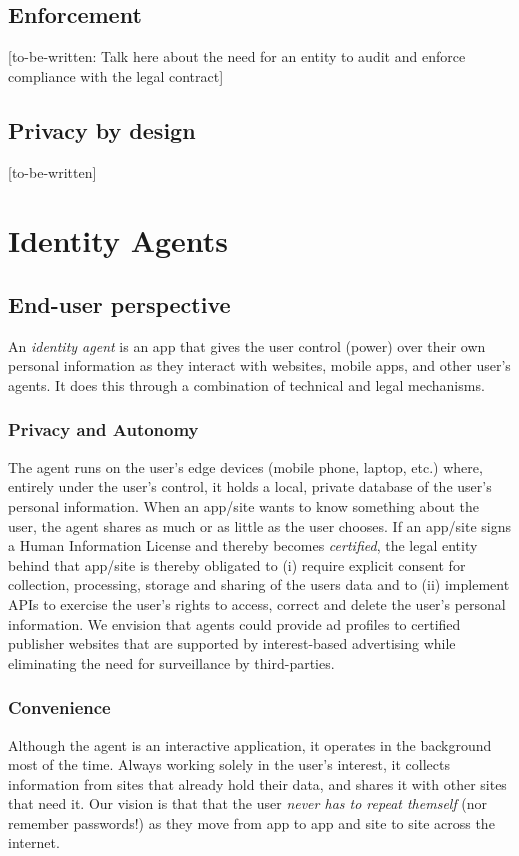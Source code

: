 \documentclass[11pt, oneside]{article}   	%
\begin{document}
\subsection{Enforcement}

[to-be-written: Talk here about the need for an entity to audit and enforce compliance with the legal contract]

\subsection{Privacy by design}
[to-be-written]

\section{Identity Agents} 

\subsection{End-user perspective}
An \emph{identity agent} is an app that gives the user control (power) over their own personal information as they interact with websites, mobile apps, and other user's agents. It does this through a combination of technical and legal mechanisms.

\subsubsection{Privacy and Autonomy} 
The agent runs on the user's edge devices (mobile phone, laptop, etc.) where, entirely under the user's control, it holds a local, private database of the user's personal information. When an app/site wants to know something about the user, the agent shares as much or as little as the user chooses. If an app/site signs a Human Information License and thereby becomes \emph{certified}, the legal entity behind that app/site is thereby obligated to (i) require explicit consent for collection, processing, storage and sharing of the users data and to (ii) implement APIs to exercise the user's rights to access, correct and delete the user's personal information. We envision that agents could provide ad profiles to certified publisher websites that are supported by interest-based advertising while eliminating the need for surveillance by third-parties.

\subsubsection{Convenience}
Although the agent is an interactive application, it operates in the background most of the time. Always working solely in the user's interest, it collects information from sites that already hold their data, and shares it with other sites that need it. Our vision is that that the user \emph{never has to repeat themself} (nor remember passwords!) as they move from app to app and site to site across the internet.
\end{document}
